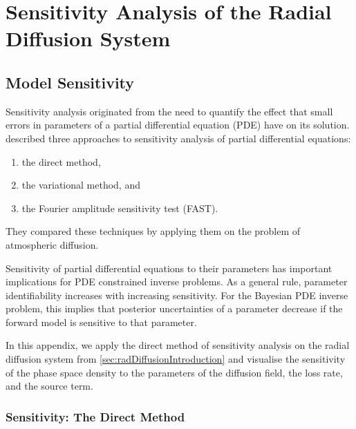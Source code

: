 \chapter{Sensitivity Analysis of the Radial Diffusion System}\label{app:psdSensitivity}

\section*{Model Sensitivity}

Sensitivity analysis originated from the need to quantify the effect that small errors in 
parameters of a partial differential equation (PDE) have on its solution. \citet{KODA1979259} 
described three approaches to sensitivity analysis of partial differential equations:
\begin{enumerate}
    \item the direct method,
    \item the variational method, and 
    \item the Fourier amplitude sensitivity test (FAST).
\end{enumerate}
They compared these techniques by applying them on the problem of atmospheric diffusion. 

Sensitivity of partial differential equations to their parameters has important implications for 
PDE constrained inverse problems. As a general rule, parameter identifiability increases with 
increasing sensitivity. For the Bayesian PDE inverse problem, this implies that posterior 
uncertainties of a parameter decrease if the forward model is sensitive to that parameter. 

In this appendix, we apply the direct method of sensitivity analysis on the radial diffusion 
system from \cref{sec:radDiffusionIntroduction} and visualise the sensitivity of the phase 
space density to the parameters of the diffusion field, the loss rate, and the source term.


\subsection*{Sensitivity: The Direct Method}


